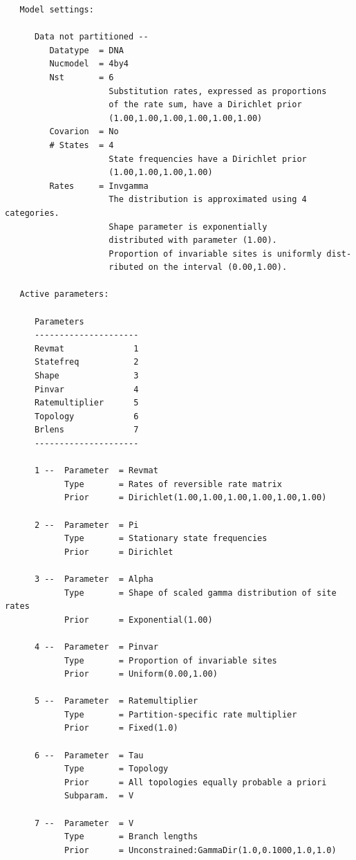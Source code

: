 \documentclass[12pt]{book}
\begin{document}
\begin{singlespacing}
\small
\begin{verbatim}
   Model settings:

      Data not partitioned --
         Datatype  = DNA
         Nucmodel  = 4by4
         Nst       = 6
                     Substitution rates, expressed as proportions
                     of the rate sum, have a Dirichlet prior
                     (1.00,1.00,1.00,1.00,1.00,1.00)
         Covarion  = No
         # States  = 4
                     State frequencies have a Dirichlet prior
                     (1.00,1.00,1.00,1.00)
         Rates     = Invgamma
                     The distribution is approximated using 4 categories.
                     Shape parameter is exponentially
                     distributed with parameter (1.00).
                     Proportion of invariable sites is uniformly dist-
                     ributed on the interval (0.00,1.00).

   Active parameters: 

      Parameters
      ---------------------
      Revmat              1
      Statefreq           2
      Shape               3
      Pinvar              4
      Ratemultiplier      5
      Topology            6
      Brlens              7
      ---------------------

      1 --  Parameter  = Revmat
            Type       = Rates of reversible rate matrix
            Prior      = Dirichlet(1.00,1.00,1.00,1.00,1.00,1.00)

      2 --  Parameter  = Pi
            Type       = Stationary state frequencies
            Prior      = Dirichlet

      3 --  Parameter  = Alpha
            Type       = Shape of scaled gamma distribution of site rates
            Prior      = Exponential(1.00)

      4 --  Parameter  = Pinvar
            Type       = Proportion of invariable sites
            Prior      = Uniform(0.00,1.00)

      5 --  Parameter  = Ratemultiplier
            Type       = Partition-specific rate multiplier
            Prior      = Fixed(1.0)

      6 --  Parameter  = Tau
            Type       = Topology
            Prior      = All topologies equally probable a priori
            Subparam.  = V

      7 --  Parameter  = V
            Type       = Branch lengths
            Prior      = Unconstrained:GammaDir(1.0,0.1000,1.0,1.0)

\end{verbatim}
\normalsize
\end{singlespacing}
\end{document}
